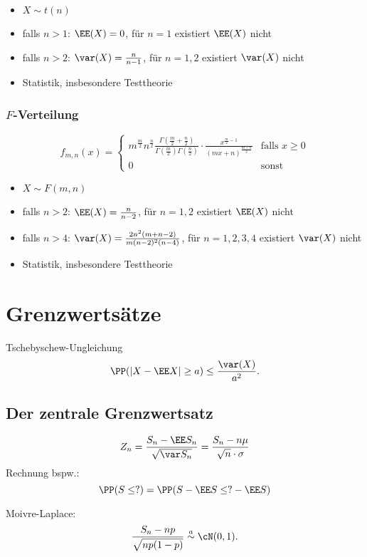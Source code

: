 \begin{itemize}
	\item $X\sim t(n)$
	\item falls $n>1$: $\EE(X)=0$, für $n=1$ existiert $\EE(X)$ nicht
	\item falls $n>2$: $\var(X)=\frac{n}{n-1}$, für $n=1,2$ existiert $\var(X)$ nicht
	\item Statistik, insbesondere Testtheorie
\end{itemize}

\subsubsection{\texorpdfstring{$ F $}{F}-Verteilung}

\[ f_{m,n}(x)=\begin{cases}
m^{\frac{m}{2}}n^{\frac{n}{2}}\frac{\Gamma\left(\frac{m}{2}+\frac{n}{2}\right)}{\Gamma\left(\frac{m}{2}\right)\Gamma\left(\frac{n}{2}\right)}\cdot \frac{x^{\frac{m}{2}-1}}{(mx+n)^{\frac{m+n}{2}}} & \text{falls }x\geq 0\\
0 & \text{sonst}
\end{cases} \] 
\begin{itemize}
	\item $X\sim F(m,n)$
	\item falls $n>2$: $\EE(X)=\frac{n}{n-2}$, für $n=1,2$ existiert $\EE(X)$ nicht
	\item falls $n>4$: $\var(X)=\frac{2n^2(m+n-2)}{m(n-2)^2(n-4)}$, für $n=1,2,3,4$ existiert $\var(X)$ nicht
	\item Statistik, insbesondere Testtheorie
\end{itemize}

\section{Grenzwertsätze}
Tschebyschew-Ungleichung
\[ \PP(|X-\EE X| \geq a) \leq \frac{\var(X)}{a^{2}} \text{.} \]

\subsection{Der zentrale Grenzwertsatz}

$$Z_n=\frac{S_n-\EE S_n}{\sqrt{\var S_n}}=\frac{S_n - n \mu}{\sqrt{n}\cdot \sigma}$$
Rechnung bspw.:
$$\PP(S \leq ?) = \PP( S - \EE S \leq ? - \EE S)$$

Moivre-Laplace:
$$\frac{S_n - np}{\sqrt{np (1-p)}} \overset{a}{\sim} \cN(0,1)\text{.}$$

